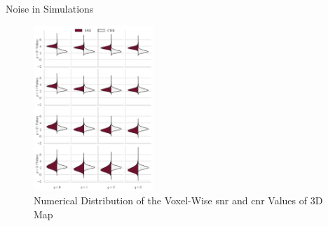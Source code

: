 \documentclass{beamer}
\begin{document}
\begin{frame}{Noise in Simulations}
\begin{figure}
\centering
\includegraphics[width=0.4\textwidth]{images/cnrsnr3D.png}
\caption{Numerical Distribution of the Voxel-Wise \gls{snr} and \gls{cnr} Values of 3D Map}
\end{figure}
\end{frame}
\end{document}
